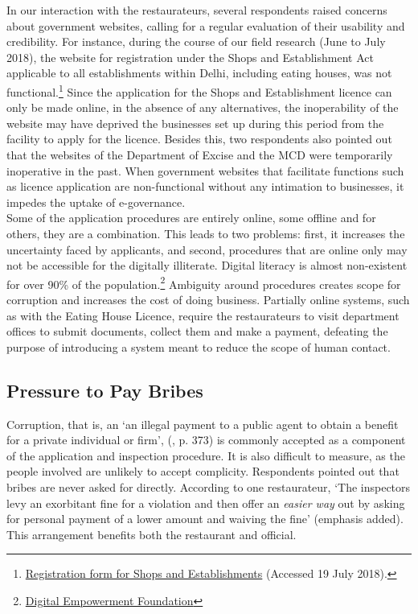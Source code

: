 \documentclass[a4paper, 12pt, twoside]{article}
\begin{document}
		In our interaction with the restaurateurs, several respondents raised concerns about government websites, calling for a regular evaluation of their usability and credibility. For instance, during the course of our field research (June to July 2018), the 
website for registration under the Shops and Establishment Act applicable to all establishments within Delhi, including eating houses, was not functional.\footnote{\href{https://bit.ly/2xfB6UJ}{Registration form for Shops and Establishments} (Accessed 19 July 
2018).} Since the application for the Shops and Establishment licence can only be made online, in the absence of any alternatives, the inoperability of the website may have deprived the businesses set up during this period from the facility to apply for the licence. 
Besides this, two respondents also pointed out that the websites of the Department of Excise and the MCD were temporarily inoperative in the past. When government websites that facilitate functions such as licence application are non-functional without any 
intimation to businesses, it impedes the uptake of e-governance. \\
		
		Some of the application procedures are entirely online, some offline and for others, they are a combination. This leads to two problems: first, it increases the uncertainty faced by applicants, and second, procedures that are online only may not be 
accessible for the digitally illiterate. Digital literacy is almost non-existent for over 90\% of the population.\footnote{\href{https://bit.ly/2NMWdaj}{Digital Empowerment Foundation}}  Ambiguity around procedures creates scope for corruption and increases the cost of 
doing business. Partially online systems, such as with the Eating House Licence, require the restaurateurs to visit department offices to submit documents, collect them and make a payment, defeating the purpose of introducing a system meant to reduce the scope 
of human contact.
		
		\subsection{Pressure to Pay Bribes}
		Corruption, that is, an ‘an illegal payment to a public agent to obtain a benefit for a private individual or firm’, (\cite{rose2008corruption}, p. 373) is commonly accepted as a component of the application and inspection procedure. It is also difficult to measure, 
as the people involved are unlikely to accept complicity. Respondents pointed out that bribes are never asked for directly. According to one restaurateur, ‘The inspectors levy an exorbitant fine for a violation and then offer an \textit{easier way} out by asking for 
personal payment of a lower amount and waiving the fine’ (emphasis added). This arrangement benefits both the restaurant and official.\\
\end{document}

